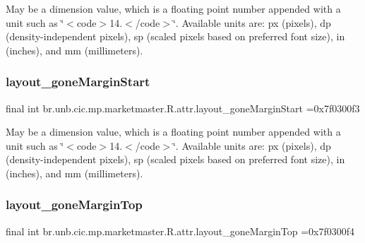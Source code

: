 May be a dimension value, which is a floating point number appended with a unit such as \char`\"{}$<$code$>$14.\+5sp$<$/code$>$\char`\"{}. Available units are\+: px (pixels), dp (density-\/independent pixels), sp (scaled pixels based on preferred font size), in (inches), and mm (millimeters). \mbox{\label{classbr_1_1unb_1_1cic_1_1mp_1_1marketmaster_1_1R_1_1attr_a2d9114ef63690637032b3b0bbf1e4ecc}} 
\subsubsection{\texorpdfstring{layout\+\_\+gone\+Margin\+Start}{layout\_goneMarginStart}}
{\footnotesize\ttfamily final int br.\+unb.\+cic.\+mp.\+marketmaster.\+R.\+attr.\+layout\+\_\+gone\+Margin\+Start =0x7f0300f3\hspace{0.3cm}{\ttfamily [static]}}

May be a dimension value, which is a floating point number appended with a unit such as \char`\"{}$<$code$>$14.\+5sp$<$/code$>$\char`\"{}. Available units are\+: px (pixels), dp (density-\/independent pixels), sp (scaled pixels based on preferred font size), in (inches), and mm (millimeters). \mbox{\label{classbr_1_1unb_1_1cic_1_1mp_1_1marketmaster_1_1R_1_1attr_a3fd4f6073c19123beb179a85d2eac438}} 
\subsubsection{\texorpdfstring{layout\+\_\+gone\+Margin\+Top}{layout\_goneMarginTop}}
{\footnotesize\ttfamily final int br.\+unb.\+cic.\+mp.\+marketmaster.\+R.\+attr.\+layout\+\_\+gone\+Margin\+Top =0x7f0300f4\hspace{0.3cm}{\ttfamily [static]}}


